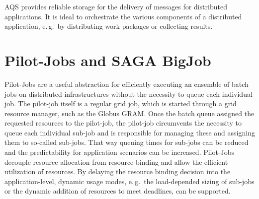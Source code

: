 \documentclass[conference,final]{IEEEtran}
\newcommand{\up}{\vspace*{-1em}}
\newcommand{\alnote}[1]{ {\textcolor{blue} { ***AL: #1 }}}
\newcommand{\jhanote}[1]{ {\textcolor{red} { ***SJ: #1 }}}
\newcommand{\alnote}[1]{}
\newcommand{\jhanote}[1]{}
\begin{document}

AQS provides reliable storage for the delivery of messages for
distributed applications.  It is ideal to orchestrate the various
components of a distributed application, e.\,g.\ by distributing work
packages or collecting results.


\up
\section{Pilot-Jobs and SAGA BigJob}
\label{sec:pilot-bj}
\up

Pilot-Jobs are a useful abstraction for efficiently executing an
ensemble of batch jobs on distributed infrastructures without 
the necessity to queue each individual
job.  The pilot-job itself is a regular grid job, which is started
through a grid resource manager, such as the Globus GRAM.  Once the
batch queue assigned the requested resources to the pilot-job, the
pilot-job circumvents the necessity to queue each individual sub-job
and is responsible for managing these and assigning them to so-called
sub-jobs. That way queuing times for sub-jobs can be reduced and the
predictability for application scenarios can be increased.  Pilot-Jobs
decouple resource allocation from resource binding and allow the
efficient utilization of resources. By delaying the resource binding
decision into the application-level, dynamic usage modes, e.\,g.\ the
load-depended sizing of sub-jobs or the dynamic addition of resources
to meet deadlines, can be supported.
\end{document}
